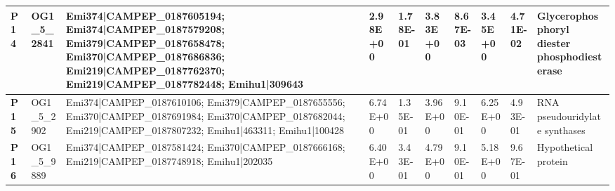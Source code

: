\begin{landscape}
\begin{center}
\begin{footnotesize}
\begin{longtable}{|p{0.5cm}|p{1.5cm}|p{4cm}|l|l|l|l|l|l|l|}
\textbf{P14} & OG1\_5\_2841  & Emi374|CAMPEP\_0187605194; Emi374|CAMPEP\_0187579208; Emi379|CAMPEP\_0187658478; Emi370|CAMPEP\_0187686836; Emi219|CAMPEP\_0187762370; Emi219|CAMPEP\_0187782448; Emihu1|309643                                                                                                                                                                                                                                                                                                                                                                                                                                                          & 2.98E+00  & 1.78E-01 & 3.83E+00  & 8.67E-03 & 3.45E+00  & 4.71E-02 & Glycerophosphoryl diester phosphodiesterase                                  \\ \hline
\textbf{P15} & OG1\_5\_2902  & Emi374|CAMPEP\_0187610106; Emi379|CAMPEP\_0187655556; Emi370|CAMPEP\_0187691984; Emi370|CAMPEP\_0187682044; Emi219|CAMPEP\_0187807232; Emihu1|463311; Emihu1|100428                                                                                                                                                                                                                                                                                                                                                                                                                                                                      & 6.74E+00  & 1.35E-01 & 3.96E+00  & 9.10E-01 & 6.25E+00  & 4.93E-01 & RNA pseudouridylate synthases                                                \\ \hline
\textbf{P16} & OG1\_5\_9889  & Emi374|CAMPEP\_0187581424; Emi370|CAMPEP\_0187666168; Emi219|CAMPEP\_0187748918; Emihu1|202035                                                                                                                                                                                                                                                                                                                                                                                                                                                                                                                                           & 6.40E+00  & 3.43E-01 & 4.79E+00  & 9.10E-01 & 5.18E+00  & 9.67E-01 & Hypothetical protein                                                         \\ \hline

\end{longtable}
\end{footnotesize}
\end{center}
\end{landscape}
